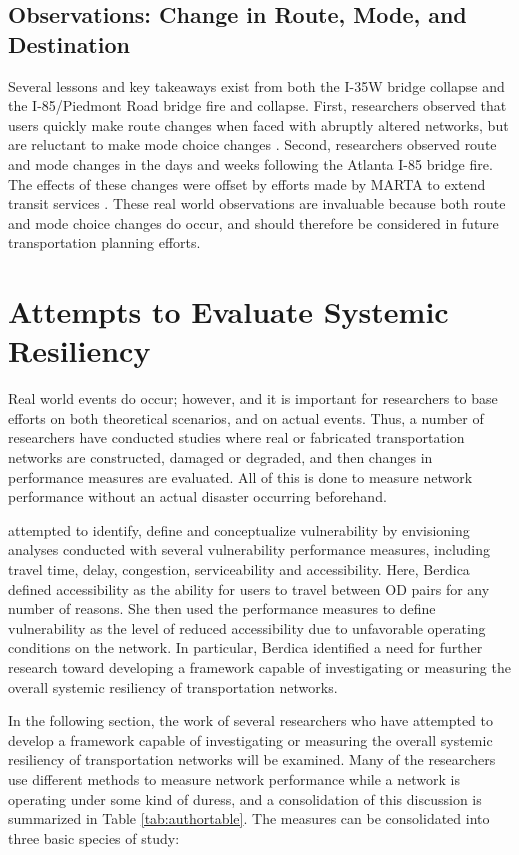 \subsection{Observations: Change in Route, Mode, and Destination}
Several lessons and key takeaways exist from both the I-35W bridge collapse and the
I-85/Piedmont Road bridge fire and collapse. First, researchers observed that users
quickly make route changes when faced with abruptly altered networks, but are reluctant
to make mode choice changes \citep{levinson2010}. Second, researchers observed
route and mode changes in the days and weeks following the Atlanta I-85 bridge fire.
The effects of these changes were offset by efforts made by MARTA to extend transit
services \citep{hamedi2018, marta2017, marta2018}. These real world observations
are invaluable because both route and mode choice changes do occur, and should therefore
be considered in future transportation planning efforts.

\section{Attempts to Evaluate Systemic Resiliency}

Real world events do occur; however, and it is important for researchers to
base efforts on both theoretical scenarios, and on actual events.
Thus, a number of researchers have conducted studies where real
or fabricated transportation networks are constructed, damaged or degraded, and
then changes in performance measures are evaluated. All of this is done to measure
network performance without
an actual disaster occurring beforehand.

\citet{berdica2002}
attempted
to identify, define and conceptualize vulnerability by envisioning
analyses conducted with
several vulnerability performance measures, including travel time, delay,
congestion,
serviceability and accessibility. Here, Berdica defined accessibility as
the ability for users to
travel between OD pairs for any number of reasons. She
then used the performance
measures to define vulnerability as the level of reduced accessibility due
to unfavorable
operating conditions on the network. In particular, Berdica identified a
need for further
research toward developing a framework capable of investigating or measuring
the overall systemic resiliency of transportation
networks.

In the following section, the work of several researchers who have attempted to develop
a framework capable of investigating or measuring the overall systemic resiliency
of transportation networks will be examined. Many of the researchers use different
methods to measure network performance while a network is operating under some kind of duress,
and a consolidation of this
discussion is summarized
in Table \ref{tab:authortable}. The measures can be consolidated into three
basic species of study:

